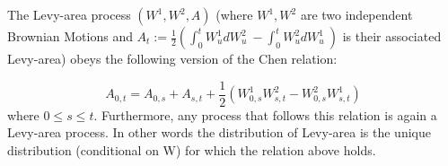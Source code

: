 \documentclass[a4paper,12pt]{article}
\begin{document}
The Levy-area process \( (W^1,W^2,A) \) (where \( W^1, W^2 \) are two independent Brownian Motions and \( A_t := \frac{1}{2} \left( \int_0^t W^1_u dW^2_u\ - \int_0^t W^2_u dW^1_u\ \right) \) is their associated Levy-area) obeys the following version of the Chen relation:

\[ A_{0,t} = A_{0,s} + A_{s,t} + \frac{1}{2}\left( W^1_{0,s} W^2_{s,t} - W^2_{0,s} W^1_{s,t} \right)  \]
where \( 0 \leq s \leq t \). Furthermore, any process that follows this relation is again a Levy-area process. In other words the distribution of Levy-area is the unique distribution (conditional on W) for which the relation above holds.
\end{document}
